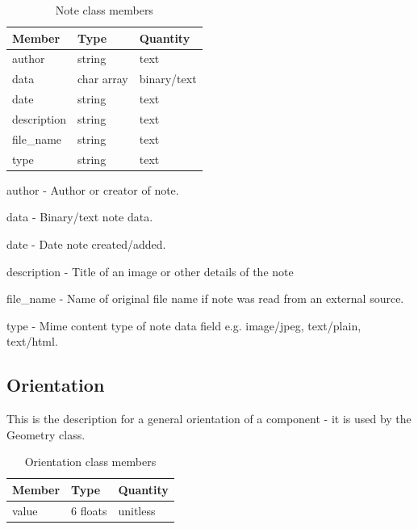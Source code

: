 \documentclass[usletter,11pt]{article}
\newcommand{\member}[2]
{ \noindent
{ \color{softBlue}  #1 - } #2
\vspace{0.2cm}
}
\begin{document}
\begin{table}[h!]\sffamily \footnotesize
\caption{Note class members}

\begin{tabular}{p{4.5cm} p{4.5cm}  p{2.5cm} }
\toprule
\bfseries Member     & \bfseries Type & \bfseries Quantity \\
\midrule

author & string & text \\
data & char array & binary/text \\
date & string & text \\
description & string & text \\
file\_name & string & text \\
type & string & text \\
\bottomrule
\end{tabular}
\end{table}

\member{author}{Author or creator of note.}

\member{data}{Binary/text note data.}

\member{date}{Date note created/added.}

\member{description}{Title of an image or other details of the note}

\member{file\_name}{Name of original file name if note was read from
 an external source.}

\member{type}{Mime content type of note data field e.g. image/jpeg,
 text/plain, text/html.}

\subsection{Orientation}
\label{table:orientation}

This is the description for a general orientation of a component - it
is used by the Geometry class.

\begin{table}[h!]\sffamily \footnotesize
\caption{Orientation class members}

\begin{tabular}{p{4.5cm} p{4.5cm}  p{2.5cm} }
\toprule
\bfseries Member     & \bfseries Type & \bfseries Quantity \\
\midrule

value & 6 floats & unitless \\
\bottomrule
\end{tabular}
\end{table}
\end{document}
